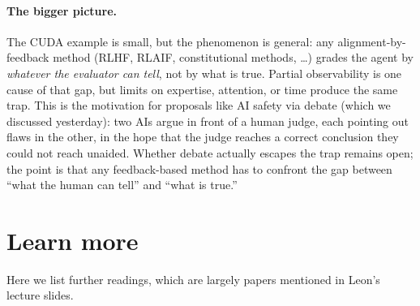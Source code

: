 \documentclass[11pt]{article}
\begin{document}
\paragraph{The bigger picture.} The CUDA example is small, but the
phenomenon is general: any alignment-by-feedback method (RLHF, RLAIF,
constitutional methods, \dots) grades the agent by \emph{whatever the
evaluator can tell}, not by what is true. Partial observability is one
cause of that gap, but limits on expertise, attention, or time produce
the same trap. This is the motivation for proposals like AI safety via
debate (which we discussed yesterday): two AIs argue in front of a
human judge, each pointing out flaws in the other, in the hope that
the judge reaches a correct conclusion they could not reach unaided.
Whether debate actually escapes the trap remains open; the point is
that any feedback-based method has to confront the gap between ``what
the human can tell'' and ``what is true.''

%

\section*{Learn more}

Here we list further readings, which are largely papers mentioned in Leon’s lecture slides.
\end{document}
